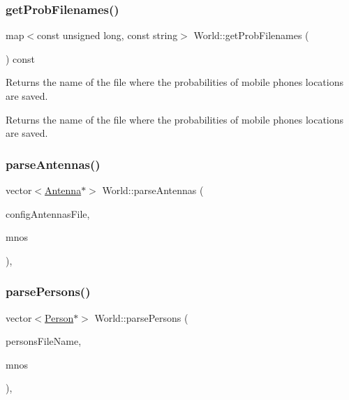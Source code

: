 \subsubsection{\texorpdfstring{get\+Prob\+Filenames()}{getProbFilenames()}}
{\footnotesize\ttfamily map$<$const unsigned long, const string$>$ World\+::get\+Prob\+Filenames (\begin{DoxyParamCaption}{ }\end{DoxyParamCaption}) const}

Returns the name of the file where the probabilities of mobile phones locations are saved. \begin{DoxyReturn}{Returns}
the name of the file where the probabilities of mobile phones locations are saved. 
\end{DoxyReturn}
\mbox{\label{class_world_aebe7c211a9ddae90773f6ec880cdca15}} 
\subsubsection{\texorpdfstring{parse\+Antennas()}{parseAntennas()}}
{\footnotesize\ttfamily vector$<$\hyperlink{class_antenna}{Antenna}$\ast$$>$ World\+::parse\+Antennas (\begin{DoxyParamCaption}\item[{const string \&}]{config\+Antennas\+File,  }\item[{vector$<$ \hyperlink{class_mobile_operator}{Mobile\+Operator} $\ast$$>$}]{mnos }\end{DoxyParamCaption})\hspace{0.3cm}{\ttfamily [private]}, {\ttfamily [noexcept]}}

\mbox{\label{class_world_a70efdf2e1864a9711b168d0677179b34}} 
\subsubsection{\texorpdfstring{parse\+Persons()}{parsePersons()}}
{\footnotesize\ttfamily vector$<$\hyperlink{class_person}{Person}$\ast$$>$ World\+::parse\+Persons (\begin{DoxyParamCaption}\item[{const string \&}]{persons\+File\+Name,  }\item[{vector$<$ \hyperlink{class_mobile_operator}{Mobile\+Operator} $\ast$$>$}]{mnos }\end{DoxyParamCaption})\hspace{0.3cm}{\ttfamily [private]}, {\ttfamily [noexcept]}}

